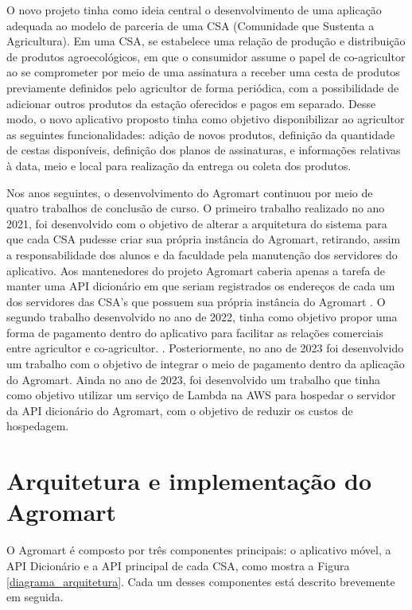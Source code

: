 O novo projeto tinha como ideia central o desenvolvimento de uma aplicação adequada ao modelo de parceria de uma CSA (Comunidade que Sustenta a Agricultura). Em uma CSA, se estabelece uma relação de produção e distribuição de produtos agroecológicos, em que o consumidor assume o papel de co-agricultor ao se comprometer por meio de uma assinatura a receber uma cesta de produtos previamente definidos pelo agricultor de forma periódica, com a possibilidade de adicionar outros produtos da estação oferecidos e pagos em separado. Desse modo, o novo aplicativo proposto tinha como objetivo disponibilizar ao agricultor as seguintes funcionalidades: adição de novos produtos, definição da quantidade de cestas disponíveis, definição dos planos de assinaturas, e informações relativas à data, meio e local para realização da entrega ou coleta dos produtos. \cite{rodriguesemacedo2021}

Nos anos seguintes, o desenvolvimento do Agromart continuou por meio de quatro trabalhos de conclusão de curso. O primeiro trabalho realizado no ano 2021, foi desenvolvido com o objetivo de alterar a arquitetura do sistema para que cada CSA pudesse criar sua própria instância do Agromart, retirando, assim a responsabilidade dos alunos e da faculdade pela manutenção dos servidores do aplicativo. Aos mantenedores do projeto Agromart caberia apenas a tarefa de manter uma API dicionário em que seriam registrados os endereços de cada um dos servidores das CSA’s que possuem sua própria instância do Agromart \cite{cellaefreitas2023}. O segundo trabalho desenvolvido no ano de 2022, tinha como objetivo propor uma forma de pagamento dentro  do aplicativo para facilitar as relações comerciais entre agricultor e co-agricultor. \cite{correiaeveludo2022}. Posteriormente, no ano de 2023 foi desenvolvido um trabalho com o objetivo de integrar o meio de pagamento dentro da aplicação do Agromart.\cite{augustiniebotinno2023} Ainda no ano de 2023, foi desenvolvido um trabalho que tinha como objetivo utilizar um serviço de Lambda na AWS para hospedar o servidor da API dicionário do Agromart, com o objetivo de reduzir os custos de hospedagem. \cite{ribeiroemagalhoes2023}

\section{Arquitetura e implementação do Agromart}
O Agromart é composto por três componentes principais: o aplicativo móvel, a API Dicionário e a API principal de cada CSA, como mostra a Figura \ref{diagrama_arquitetura}. Cada um desses componentes está descrito brevemente em seguida.

